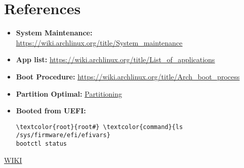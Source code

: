 \documentclass[10pt, a4paper, onecolumn, openany]{book} %
\begin{document}
\chapter{References}
\begin{itemize}
    \item \textbf{System Maintenance:}
\newline \underline{\href{https://wiki.archlinux.org/title/System\_maintenance}{https://wiki.archlinux.org/title/System\_maintenance}}
    \item \textbf{App list:}
\newline \underline{\href{https://wiki.archlinux.org/title/List\_of\_applications}{https://wiki.archlinux.org/title/List\_of\_applications}}

    \item \textbf{Boot Procedure:}
\newline \underline{\href{https://wiki.archlinux.org/title/Arch\_boot\_process}{https://wiki.archlinux.org/title/Arch\_boot\_process}}
    \item \textbf{Partition Optimal:}
\newline \underline{\href{https://rainbow.chard.org/2013/01/30/how-to-align-partitions-for-best-performance-using-parted/}{Partitioning}}
    \item \textbf{Booted from UEFI:}
\begin{Verbatim}[commandchars=\\\{\}]
\textcolor{root}{root#} \textcolor{command}{ls /sys/firmware/efi/efivars}
bootctl status
\end{Verbatim}
\end{itemize}
\href{https://wiki.archlinux.org/title/General_recommendations}{WIKI}
\end{document}
